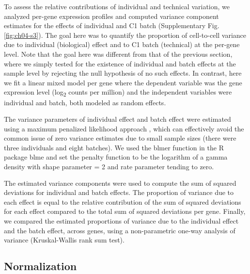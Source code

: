 To assess the relative contributions of individual and technical
variation, we analyzed per-gene expression profiles and computed
variance component estimates for the effects of individual and C1 batch
(Supplementary Fig. \ref{fig:ch04-s3}). The goal here was to quantify the proportion of
cell-to-cell variance due to individual (biological) effect and to C1
batch (technical) at the per-gene level. Note that the goal here was
different from that of the previous section, where we simply tested for
the existence of individual and batch effects at the sample level by
rejecting the null hypothesis of no such effects. In contrast, here we
fit a linear mixed model per gene where the dependent variable was the
gene expression level (log\textsubscript{2} counts per million) and the
independent variables were individual and batch, both modeled as random
effects.

The variance parameters of individual effect and batch effect were
estimated using a maximum penalized likelihood approach
\citep{Chung2013}, which can effectively avoid the common issue of zero
variance estimates due to small sample sizes (there were three
individuals and eight batches). We used the blmer function in the R
package blme and set the penalty function to be the logarithm of a gamma
density with shape parameter = 2 and rate parameter tending to zero.

The estimated variance components were used to compute the sum of
squared deviations for individual and batch effects. The proportion of
variance due to each effect is equal to the relative contribution of the
sum of squared deviations for each effect compared to the total sum of
squared deviations per gene. Finally, we compared the estimated
proportions of variance due to the individual effect and the batch
effect, across genes, using a non-parametric one-way analysis of
variance (Kruskal-Wallis rank sum test).

\subsection{Normalization}\label{normalization}

